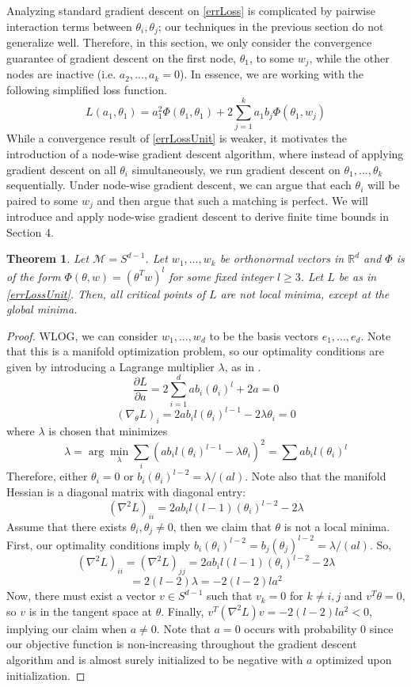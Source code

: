 \documentclass{article}
\newtheorem{theorem}{Theorem}[section]
\newcommand{\R}{{\mathbb{R}}}
\newcommand{\pd}[2]{\frac{\partial#1}{\partial#2}}
\begin{document}
Analyzing standard gradient descent on \eqref{errLoss} is complicated by pairwise interaction terms between $\theta_i, \theta_j$; our techniques in the previous section do not generalize well. Therefore, in this section, we only consider the convergence guarantee of gradient descent on the first node, $\theta_1$, to some $w_j$, while the other nodes are inactive (i.e. $a_2,...,a_k = 0$). In essence, we are working with the following simplified loss function.
\begin{equation}\label{errLossUnit}
L(a_1,\theta_1) =  a_1^2 \Phi(\theta_1,\theta_1)  + 2\sum_{j=1}^k a_1b_j \Phi(\theta_1,w_j)
\end{equation}
While a convergence result of \eqref{errLossUnit} is weaker, it motivates the introduction of a node-wise gradient descent algorithm, where instead of applying gradient descent on all $\theta_i$ simultaneously, we run gradient descent on $\theta_1,...,\theta_k$ sequentially. Under node-wise gradient descent, we can argue that each $\theta_i$ will be paired to some $w_j$ and then argue that such a matching is perfect. We will introduce and apply node-wise gradient descent to derive finite time bounds in Section 4.
\begin{theorem}
\label{PolyStrict}
Let $\mathcal{M} = S^{d-1}$. Let $w_1,...,w_k$ be orthonormal vectors in $\R^d$ and $\Phi$ is of the form $\Phi(\theta,w) = (\theta^Tw)^l$ for some fixed integer $l \geq 3$. Let $L$ be as in \eqref{errLossUnit}. Then, all critical points of $L$ are not local minima, except at the global minima. 
\end{theorem}
\begin{proof}
WLOG, we can consider $w_1,...,w_d$ to be the basis vectors $e_1,...,e_d$. Note that this is a manifold optimization problem, so our optimality conditions are given by introducing a Lagrange multiplier $\lambda$, as in \cite{GeHJY15}.
\[\pd{L}{a} = 2\sum_{i=1}^d ab_i (\theta_i)^l + 2a = 0\]
\[ (\nabla_\theta L)_i = 2ab_il(\theta_i)^{l-1}  -2\lambda \theta_i = 0 \]
where $\lambda$ is chosen that minimizes 
\[\lambda = \arg \min_\lambda \sum_i (ab_i l (\theta_i)^{l-1} - \lambda\theta_i)^2 = \sum ab_i l (\theta_i)^l \]
Therefore, either $\theta_i = 0$ or $b_i (\theta_i)^{l-2} = \lambda/(al)$. Note also that the manifold Hessian is a diagonal matrix with diagonal entry: 
\[(\nabla^2 L)_{ii} = 2a b_i l(l-1)(\theta_i)^{l-2} - 2 \lambda\]
Assume that there exists $\theta_i, \theta_j \neq 0$, then we claim that $\theta$ is not a local minima.  First, our optimality conditions imply $b_i(\theta_i)^{l-2} = b_j (\theta_j)^{l-2} = \lambda/(al)$. So,
\[(\nabla^2 L)_{ii} = (\nabla^2L)_{jj} = 2a b_i l(l-1)(\theta_i)^{l-2} - 2 \lambda\]
\[ = 2(l-2)\lambda = -2(l-2)la^2\]
Now, there must exist a vector $v \in S^{d-1}$ such that $v_k = 0$ for $k \neq i,j$ and $v^T\theta = 0$, so $v$ is in the tangent space at $\theta$. Finally, $v^T(\nabla^2 L) v  = -2(l-2)l a^2 < 0$, implying our claim when $a \neq 0$. Note that $a = 0$ occurs with probability 0 since our objective function is non-increasing throughout the gradient descent algorithm and is almost surely initialized to be negative with $a$ optimized upon initialization.
\end{proof}
\end{document}
